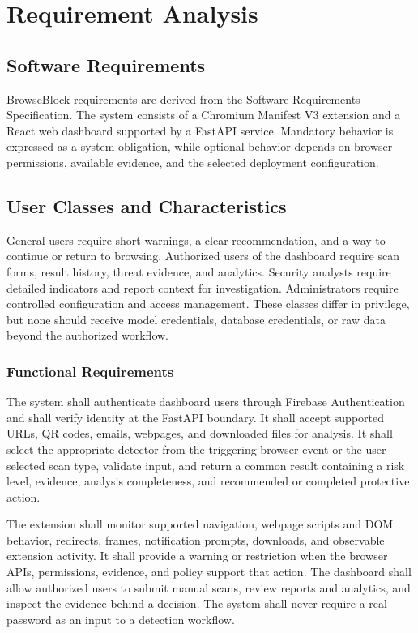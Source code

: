 \chapter{Requirement Analysis}
\setcounter{equation}{0}

\section{Software Requirements}
BrowseBlock requirements are derived from the Software Requirements Specification.
The system consists of a Chromium Manifest V3 extension and a React web dashboard
supported by a FastAPI service. Mandatory behavior is expressed as a system
obligation, while optional behavior depends on browser permissions, available
evidence, and the selected deployment configuration.

\section{User Classes and Characteristics}
General users require short warnings, a clear recommendation, and a way to continue
or return to browsing. Authorized users of the dashboard require scan forms, result
history, threat evidence, and analytics. Security analysts require detailed
indicators and report context for investigation. Administrators require controlled
configuration and access management. These classes differ in privilege, but none
should receive model credentials, database credentials, or raw data beyond the
authorized workflow.

\subsection{Functional Requirements}
The system shall authenticate dashboard users through Firebase Authentication and
shall verify identity at the FastAPI boundary. It shall accept supported URLs, QR
codes, emails, webpages, and downloaded files for analysis. It shall select the
appropriate detector from the triggering browser event or the user-selected scan
type, validate input, and return a common result containing a risk level, evidence,
analysis completeness, and recommended or completed protective action.

The extension shall monitor supported navigation, webpage scripts and DOM behavior,
redirects, frames, notification prompts, downloads, and observable extension
activity. It shall provide a warning or restriction when the browser APIs,
permissions, evidence, and policy support that action. The dashboard shall allow
authorized users to submit manual scans, review reports and analytics, and inspect
the evidence behind a decision. The system shall never require a real password as
an input to a detection workflow.

